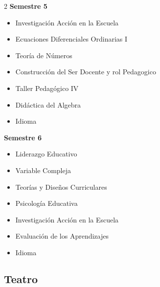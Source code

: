 \documentclass[12pt,a4paper]{article}
\begin{document}
\begin{multicols}{2}
		\textbf{Semestre 5}
		\begin{itemize}
			\item Investigación Acción en la Escuela
			\item Ecuaciones Diferenciales Ordinarias I
			\item Teoría de Números
			\item Construcción del Ser Docente y rol Pedagogico
			\item Taller Pedagógico IV
			\item Didáctica del Algebra
			\item Idioma
		\end{itemize}
		
		\textbf{Semestre 6}
		\begin{itemize}
			\item Liderazgo Educativo
			\item Variable Compleja
			\item Teorías y Diseños Curriculares
			\item Psicología Educativa
			\item Investigación Acción en la Escuela
			\item Evaluación de los Aprendizajes 
			\item Idioma
		\end{itemize}
	\end{multicols}
	
	\newpage
	
	\subsection{Teatro}
	
\end{document}
